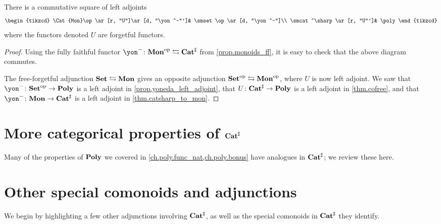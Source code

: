 \documentclass[Book-Poly]{subfiles}
\begin{document}
\begin{proposition}\label{prop.traj_mon_poly}
There is a commutative square of left adjoints
\[
\begin{tikzcd}
	\Cat{Mon}\op\ar[r, "U"]\ar[d, "\yon^-"']&
	\smset\op\ar[d, "\yon^-"]\\
	\smcat^\sharp\ar[r, "U"']&
	\poly
\end{tikzcd}
\]
where the functors denoted $U$ are forgetful functors.
\end{proposition}
\begin{proof}
Using the fully faithful functor $\yon^-\colon\Cat{Mon}\op\fromto\smcat^\sharp$ from \cref{prop.monoids_ff}, it is easy to check that the above diagram commutes. 

The free-forgetful adjunction $\mathbf{Set}\leftrightarrows\mathbf{Mon}$ gives an opposite adjunction $\mathbf{Set}^{\textnormal{op}}\leftrightarrows\mathbf{Mon}^{\textnormal{op}}$, where $U$ is now left adjoint. We saw that $\yon^-\colon\smset\op\to\poly$ is a left adjoint in \cref{prop.yoneda_left_adjoint}, that $U\colon\mathbf{Cat}^\sharp\to\mathbf{Poly}$ is a left adjoint in \cref{thm.cofree}, and that $\yon^-\colon\Cat{Mon}\to\smcat^\sharp$ is a left adjoint in \cref{thm.catsharp_to_mon}.
\end{proof}

\section{More categorical properties of $\mathbf{Cat}^\sharp$}

Many of the properties of $\mathbf{Poly}$ we covered in \cref{ch.poly.func_nat,ch.poly.bonus} have analogues in $\mathbf{Cat}^\sharp$; we review these here.

\section{Other special comonoids and adjunctions}

We begin by highlighting a few other adjunctions involving $\mathbf{Cat}^\sharp$, as well as the special comonoids in $\mathbf{Cat}^\sharp$ they identify.
\end{document}
